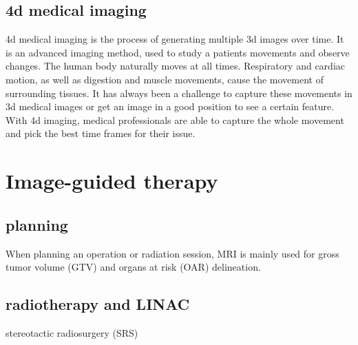   \subsection{4d medical imaging}
  \label{4d medical imaging}
  4d medical imaging is the process of generating multiple 3d images over time. It is an advanced imaging method, used to study a patients movements and observe changes. The human body naturally moves at all times. Respiratory and cardiac motion, as well as digestion and muscle movements, cause the movement of surrounding tissues. It has always been a challenge to capture these movements in 3d medical images or get an image in a good position to see a certain feature. With 4d imaging, medical professionals are able to capture the whole movement and pick the best time frames for their issue.

\section{Image-guided therapy}
\label{Image-guided therapy}

\subsection{planning}
  \label{planning}
When planning an operation or radiation session, MRI is mainly used for gross tumor volume (GTV) and organs at risk (OAR) delineation.
\cite{lineyMRIRadiotherapyPlanning2019}

  \subsection{radiotherapy and LINAC}
    \label{radiotherapy and LINAC}
stereotactic radiosurgery (SRS)
